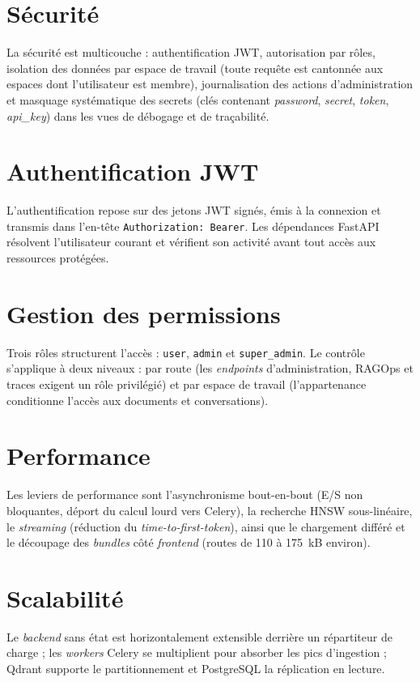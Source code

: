 \section{Sécurité}
La sécurité est multicouche : authentification JWT, autorisation par rôles,
isolation des données par espace de travail (toute requête est cantonnée aux
espaces dont l'utilisateur est membre), journalisation des actions
d'administration et masquage systématique des secrets (clés contenant
\emph{password}, \emph{secret}, \emph{token}, \emph{api\_key}) dans les vues de
débogage et de traçabilité.

\section{Authentification JWT}
L'authentification repose sur des jetons JWT signés, émis à la connexion et
transmis dans l'en-tête \texttt{Authorization: Bearer}. Les dépendances FastAPI
résolvent l'utilisateur courant et vérifient son activité avant tout accès aux
ressources protégées.

\section{Gestion des permissions}
Trois rôles structurent l'accès : \texttt{user}, \texttt{admin} et
\texttt{super\_admin}. Le contrôle s'applique à deux niveaux : par route (les
\emph{endpoints} d'administration, RAGOps et traces exigent un rôle privilégié) et
par espace de travail (l'appartenance conditionne l'accès aux documents et
conversations).

\section{Performance}
Les leviers de performance sont l'asynchronisme bout-en-bout (E/S non bloquantes,
déport du calcul lourd vers Celery), la recherche HNSW sous-linéaire, le
\emph{streaming} (réduction du \emph{time-to-first-token}), ainsi que le
chargement différé et le découpage des \emph{bundles} côté \emph{frontend}
(routes de 110 à 175~kB environ).

\section{Scalabilité}
Le \emph{backend} sans état est horizontalement extensible derrière un répartiteur
de charge ; les \emph{workers} Celery se multiplient pour absorber les pics
d'ingestion ; Qdrant supporte le partitionnement et PostgreSQL la réplication en
lecture.

